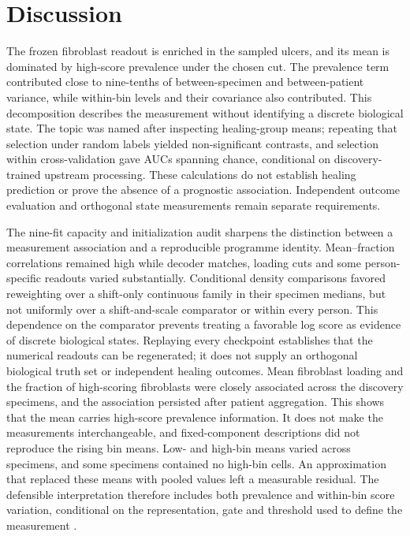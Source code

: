 \section{Discussion}

The frozen fibroblast readout is enriched in the sampled ulcers, and its mean is dominated by high-score prevalence under the chosen cut. The prevalence term contributed close to nine-tenths of between-specimen and between-patient variance, while within-bin levels and their covariance also contributed. This decomposition describes the measurement without identifying a discrete biological state. The topic was named after inspecting healing-group means; repeating that selection under random labels yielded non-significant contrasts, and selection within cross-validation gave AUCs spanning chance, conditional on discovery-trained upstream processing. These calculations do not establish healing prediction or prove the absence of a prognostic association. Independent outcome evaluation and orthogonal state measurements remain separate requirements.


The nine-fit capacity and initialization audit sharpens the distinction between a measurement association and a reproducible programme identity. Mean--fraction correlations remained high while decoder matches, loading cuts and some person-specific readouts varied substantially. Conditional density comparisons favored reweighting over a shift-only continuous family in their specimen medians, but not uniformly over a shift-and-scale comparator or within every person. This dependence on the comparator prevents treating a favorable log score as evidence of discrete biological states. Replaying every checkpoint establishes that the numerical readouts can be regenerated; it does not supply an orthogonal biological truth set or independent healing outcomes.
Mean fibroblast loading and the fraction of high-scoring fibroblasts were closely associated across the discovery specimens, and the association persisted after patient aggregation. This shows that the mean carries high-score prevalence information. It does not make the measurements interchangeable, and fixed-component descriptions did not reproduce the rising bin means. Low- and high-bin means varied across specimens, and some specimens contained no high-bin cells. An approximation that replaced these means with pooled values left a measurable residual. The defensible interpretation therefore includes both prevalence and within-bin score variation, conditional on the representation, gate and threshold used to define the measurement \citep{altman2006,buettner2021}.

